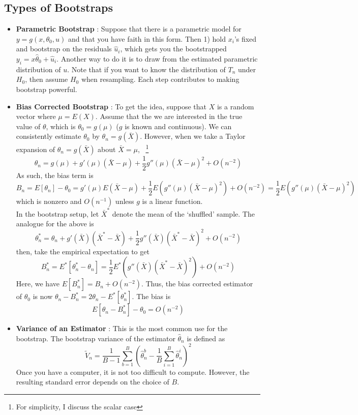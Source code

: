 \documentclass[12pt]{article}
\theoremstyle{definition}
\theoremstyle{property}
\theoremstyle{assumption}
\theoremstyle{example}
\theoremstyle{comment}
\begin{document}
\subsection{Types of Bootstraps}
\begin{itemize}
\item \textbf{Parametric Bootstrap} : Suppose that there is a parametric model for $y=g(x,\theta_0,u)$ and that you have faith in this form. Then 1) hold $x_i$'s fixed and bootstrap on the residuals $\hat{u}_i$, which gets you the bootstrapped $y_i = x\hat{\theta}_0+\hat{u}_i$. Another way to do it is to draw from the estimated parametric distribution of $u$. Note that if you want to know the distribution  of $T_n$ under $H_0$, then assume $H_0$ when resampling. Each step contributes to making bootstrap powerful.
\item \textbf{Bias Corrected Bootstrap} : To get the idea, suppose that $X$ is a random vector where $\mu=E(X)$. Assume that the we are interested in the true value of $\theta$, which is $\theta_0=g(\mu)$ ($g$ is known and continuous). We can consistently estimate $\theta_0$ by $\theta_n = g(\bar{X})$. However, when we take a Taylor expansion of $\theta_n=g(\bar{X})$ about $\bar{X}=\mu$, \ \footnote{For simplicity, I discuss the scalar case} 
\[
\theta_n  = g(\mu)+g'(\mu)(\bar{X}-\mu)+\frac{1}{2}g''(\mu)(\bar{X}-\mu)^2+O(n^{-2})
\]
As such, the bias term is
\[
B_n=E[\theta_n]-\theta_0 = g'(\mu)E(\bar{X}-\mu)+\frac{1}{2}E(g''(\mu)(\bar{X}-\mu)^2)+O(n^{-2})=\frac{1}{2}E(g''(\mu)(\bar{X}-\mu)^2)
\]
which is nonzero and $O(n^{-1})$ unless $g$ is a linear function. \\
In the bootstrap setup, let $\bar{X}^*$ denote the mean of the `shuffled' sample. The analogue for the above is
\[
\theta_n^* =\theta_n+g'(\bar{X})(\bar{X}^*-\bar{X})+\frac{1}{2}g''(\bar{X})(\bar{X}^*-\bar{X})^2+O(n^{-2})
\]
then, take the empirical  expectation to get
\[
B_n^*=E^*[\theta_n^*-\theta_n]=\frac{1}{2}E^*(g''(\bar{X})(\bar{X}^*-\bar{X})^2)+O(n^{-2})
\]
Here, we have $E[B_n^*]=B_n+O(n^{-2})$. Thus, the bias corrected estimator of $\theta_0$ is now $\theta_n-B_n^*=2\theta_n-E^*[\theta_n^*]$. The bias is
\[
E[\theta_n-B_n^*]-\theta_0=O(n^{-2})
\]
\item \textbf{Variance of an Estimator} : This is the most common use for the bootstrap. The bootstrap variance of the estimator $\hat{\theta}_n$ is defined as
\[
\tilde{V}_n = \frac{1}{B-1}\sum_{b=1}^B\left(\hat{\theta}_n^b-\frac{1}{B}\sum_{i=1}^B\hat{\theta}_n^i\right)^2
\]
Once you have a computer, it is not too difficult to compute. However, the resulting standard error depends on the choice of $B$.

\end{itemize}
\end{document}
